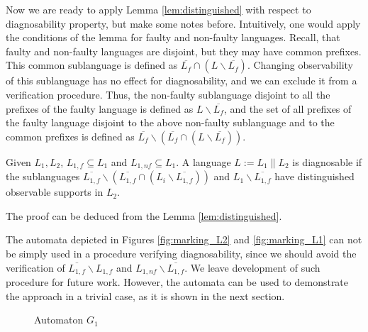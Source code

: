 \documentclass[letterpaper, 10pt, conference]{ieeeconf}
\begin{document}
Now we are ready to apply Lemma \ref{lem:distinguished} with respect to
diagnosability property, but make some notes before. Intuitively, one would
apply the conditions of the lemma for faulty and non-faulty languages. Recall,
that faulty and non-faulty languages are disjoint, but they may have common
prefixes. This common sublanguage is defined as $\overline{L_{f}} \cap (L
\backslash \overline{L_{f}})$. Changing observability of this sublanguage has no
effect for diagnosability, and we can exclude it from a verification procedure.
Thus, the non-faulty sublanguage disjoint to all the prefixes of the faulty
language is defined as $L \backslash \overline{L_f}$, and the set of all
prefixes of the faulty language disjoint to the above non-faulty sublanguage and
to the common prefixes is defined as $\overline{L_f} \backslash (\overline{L_f}
\cap (L \backslash \overline{L_f}))$.

\begin{lemma}
\label{lem:diagnosable}
Given $L_1, L_2$, $L_{1,f} \subseteq L_1$ and $L_{1,nf} \subseteq L_1$. A
language $L := L_1 \parallel L_2$ is diagnosable if the sublanguages
$\overline{L_{1,f}} \backslash (\overline{L_{1,f}} \cap (L_i \backslash
\overline{L_{1,f}}))$ and $L_{1} \backslash \overline{L_{1,f}}$ have
distinguished observable supports in $L_2$.
\end{lemma}
The proof can be deduced from the Lemma \ref{lem:distinguished}. 

The automata depicted in Figures \ref{fig:marking_L2} and
\ref{fig:marking_L1} can not be simply used in a procedure verifying
diagnosability, since we should avoid the verification of $\overline{L_{1,f}}
\backslash L_{1,f}$ and $L_{1,nf} \backslash \overline{L_{1,f}}$. We leave
development of such procedure for future work. However, the automata can be
used to demonstrate the approach in a trivial case, as it is shown in the next
section.


\begin{figure}[t]
\centering
{}
\caption{Automaton $G_1$}
\label{fig:G1}
\end{figure}
\end{document}
